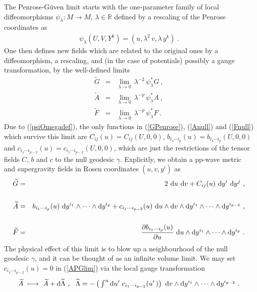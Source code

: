 \documentclass[11pt,a4paper]{article}
\def\dd{{\rm d}}
\newcommand{\real}{{\mathbb R}} %
\def\nn{\nonumber}
\def\bea{\begin{eqnarray}}
\def\eea{\end{eqnarray}}
\newcommand{\beq}{\begin{eqnarray}}
\newcommand{\eeq}{\end{eqnarray}}
\begin{document}
The Penrose-G\"uven limit starts with the one-parameter family of
local diffeomorphisms $\psi_\lambda:M\to M$, $\lambda\in\real$ defined
by a rescaling of the Penrose coordinates as
\beq
\psi_\lambda\left(U,V,Y^k\right)=\left(u,\lambda^2\,v,
\lambda\,y^k\right) \ .
\label{psiOmegadef}\eeq
One then defines new fields which are related to the original ones by
a diffeomorphism, a rescaling, and (in the case of potentials) possibly
a gauge transformation, by the well-defined limits
\bea
\widetilde{G}&=&\lim_{\lambda\to0}\,\lambda^{-2}\,\psi^*_\lambda G \ ,
\nn\\\widetilde{A}&=&\lim_{\lambda\to0}\,\lambda^{-p}\,\psi^*_\lambda A
\ , \nn\\\widetilde{F}&=&\lim_{\lambda\to0}\,\lambda^{-p}\,\psi^*_\lambda
F \ .
\label{PGlimitsdef}\eea
Due to (\ref{psiOmegadef}), the only functions in (\ref{GPenrose}),
(\ref{Anull}) and (\ref{Fnull}) which survive this limit are
$C_{ij}(u)=C_{ij}(U,0,0)$, $b_{i_1\cdots i_p}(u)=b_{i_1\cdots
  i_p}(U,0,0)$ and $c_{i_1\cdots i_{p-2}}(u)=c_{i_1\cdots
  i_{p-2}}(U,0,0)$, which are just the restrictions of the tensor fields $C$,
$b$ and $c$ to the null geodesic $\gamma$. Explicitly, we
obtain a pp-wave metric and supergravity fields in Rosen
coordinates $(u,v,y^i)$ as
\bea
\widetilde{G}&=&2~\dd u~\dd v+C_{ij}(u)~\dd y^i~\dd y^j \ ,
\label{GPGlim}\\&&{~~~~}_{~~}^{~~}\nn\\
\widetilde{A}&=&b_{i_1\cdots i_p}(u)~\dd y^{i_1}
\wedge\cdots\wedge\dd y^{i_p}+c_{i_1\cdots i_{p-2}}(u)~\dd u
\wedge\dd v\wedge\dd y^{i_1}\wedge\cdots\wedge\dd y^{i_{p-2}} \ ,
\label{APGlim}\\&&{~~~~}_{~~}^{~~}\nn\\
\widetilde{F}&=&\frac{\partial b_{i_1\cdots i_p}(u)}
{\partial u}~\dd u\wedge\dd y^{i_1}\wedge\cdots\wedge\dd y^{i_p} \ .
\label{FPGlim}\eea
The physical effect of this limit is to blow up a neighbourhood of the
null geodesic $\gamma$, and it can be thought of as an infinite volume
limit. We may set $c_{i_1\cdots i_{p-2}}(u)=0$ in (\ref{APGlim}) via
the local gauge transformation
\beq
\widetilde{A}~\longmapsto~\widetilde{A}+\dd\widetilde{\Lambda} \ , ~~
\widetilde{\Lambda}=-\left(\,\mbox{$\int^u$}\,\dd u'~c_{i_1\cdots
    i_{p-2}}(u'\,)\right)~\dd v\wedge\dd y^{i_1}\wedge\cdots\wedge
\dd y^{i_{p-2}} \ .
\label{APGcset0}\eeq
\end{document}
